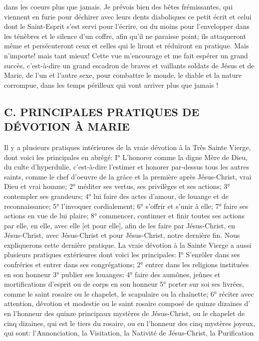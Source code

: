 dans les coeurs plus que jamais.
 Je prévois bien des bêtes frémissantes, qui viennent en furie pour déchirer avec leurs dents diaboliques ce
petit écrit et celui dont le Saint-Esprit s'est servi pour l'écrire, ou du moins pour l'envelopper dans les ténèbres et le
silence d'un coffre, afin qu'il ne paraisse point; ils attaqueront même et persécuteront ceux et celles qui le liront et
réduiront en pratique. Mais n'importe! mais tant mieux! Cette vue m'encourage et me fait espérer un grand succès,
c'est-à-dire un grand escadron de braves et vaillants soldats de Jésus et de Marie, de l'un et l'autre sexe, pour
combattre le monde, le diable et la nature corrompue, dans les temps périlleux qui vont arriver plus que jamais !
\subsection{C. PRINCIPALES PRATIQUES DE DÉVOTION À MARIE}
 Il y a plusieurs pratiques intérieures de la vraie dévotion à la Très Sainte Vierge, dont voici les principales en
abrégé:
I° L'honorer comme la digne Mère de Dieu, du culte d'hyperdulie, c'est-à-dire l'estimer et honorer par-dessus tous
les autres saints, comme le chef d'oeuvre de la grâce et la première après Jésus-Christ, vrai Dieu et vrai homme;
2° méditer ses vertus, ses privilèges et ses actions; 3° contempler ses grandeurs; 4° lui faire des actes d'amour, de
louange et de reconnaissance; 5° l'invoquer cordialement; 6° s'offrir et s'unir à elle; 7° faire ses actions en vue de
lui plaire; 8° commencer, continuer et finir toutes ses actions par elle, en elle, avec elle [et pour elle], afin de les
faire par Jésus-Christ, en Jésus-Christ, avec Jésus-Christ et pour Jésus-Christ, notre dernière fin. Nous
expliquerons cette dernière pratique.
 La vraie dévotion à la Sainte Vierge a aussi plusieurs pratiques extérieures dont voici les principales:
I° S'enrôler dans ses confréries et entrer dans ses congrégations; 2° entrer dans les religions instituées en son
honneur 3° publier ses louanges; 4° faire des aumônes, jeûnes et mortifications d'esprit ou de corps en son
honneur 5° porter sur soi ses livrées, comme le saint rosaire ou le chapelet, le scapulaire ou la chaînette; 6° réciter
avec attention, dévotion et modestie ou le saint rosaire composé de quinze dizaines d' en l'honneur des
quinze principaux mystères de Jésus-Christ, ou le chapelet de cinq dizaines, qui est le tiers du rosaire, ou en
l'honneur des cinq mystères joyeux, qui sont: l'Annonciation, la Visitation, la Nativité de Jésus-Christ, la Purification
